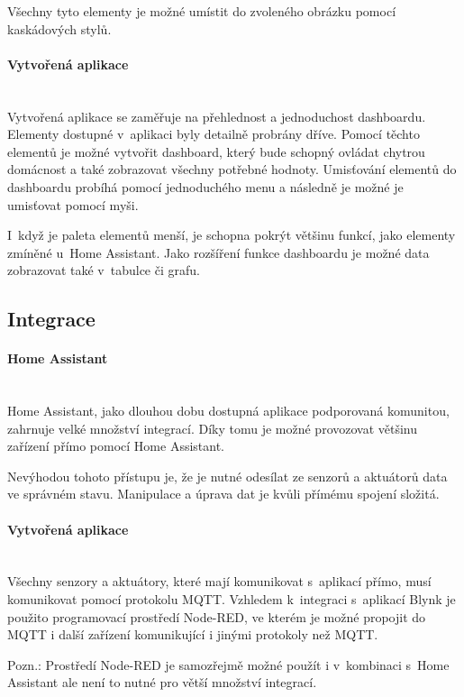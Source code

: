Všechny tyto elementy je možné umístit do zvoleného obrázku pomocí kaskádových stylů.

\paragraph*{Vytvořená aplikace}\mbox{} \\
Vytvořená aplikace se zaměřuje na přehlednost a jednoduchost dashboardu. Elementy dostupné v~aplikaci byly detailně probrány dříve. Pomocí těchto elementů je možné vytvořit dashboard, který bude schopný ovládat chytrou domácnost a také zobrazovat všechny potřebné hodnoty. Umisťování elementů do dashboardu probíhá pomocí jednoduchého menu a následně je možné je umisťovat pomocí myši.

I~když je paleta elementů menší, je schopna pokrýt většinu funkcí, jako elementy zmíněné u~Home Assistant. 
Jako rozšíření funkce dashboardu je možné data zobrazovat také v~tabulce či grafu.

\subsection*{Integrace}
\paragraph*{Home Assistant}\mbox{} \\
Home Assistant, jako dlouhou dobu dostupná aplikace podporovaná komunitou, zahrnuje velké množství integrací. Díky tomu je možné provozovat většinu zařízení přímo pomocí Home Assistant. 

Nevýhodou tohoto přístupu je, že je nutné odesílat ze senzorů a aktuátorů data ve správném stavu. Manipulace a úprava dat je kvůli přímému spojení složitá.

\paragraph*{Vytvořená aplikace}\mbox{} \\
Všechny senzory a aktuátory, které mají komunikovat s~aplikací přímo, musí komunikovat pomocí protokolu MQTT. Vzhledem k~integraci s~aplikací Blynk je použito programovací prostředí Node-RED, ve kterém je možné propojit do MQTT i další zařízení komunikující i jinými protokoly než MQTT. 

Pozn.: Prostředí Node-RED je samozřejmě možné použít i v~kombinaci s~Home Assistant ale není to nutné pro větší množství integrací.

